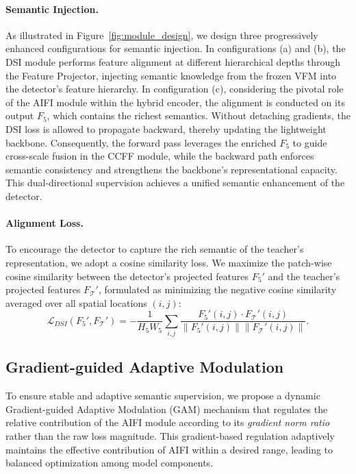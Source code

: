 \paragraph{Semantic Injection.}
As illustrated in Figure~\ref{fig:module_design}, we design three progressively enhanced configurations for semantic injection.
In configurations (a) and (b), the DSI module performs feature alignment at different hierarchical depths through the Feature Projector, injecting semantic knowledge from the frozen VFM into the detector's feature hierarchy.
In configuration (c), considering the pivotal role of the AIFI module within the hybrid encoder, the alignment is conducted on its output $F_5$, which contains the richest semantics.
Without detaching gradients, the DSI loss is allowed to propagate backward, thereby updating the lightweight backbone.
Consequently, the forward pass leverages the enriched $F_5$ to guide cross-scale fusion in the CCFF module, while the backward path enforces semantic consistency and strengthens the backbone’s representational capacity.
This dual-directional supervision achieves a unified semantic enhancement of the detector.

\paragraph{Alignment Loss.} 
To encourage the detector to capture the rich semantic of the teacher's representation, we adopt a cosine similarity loss.
We maximize the patch-wise cosine similarity between the detector's projected features $F_5'$ and the teacher's projected features $F_{\mathcal{T}}'$, formulated as minimizing the negative cosine similarity averaged over all spatial locations $(i, j)$:
\begin{equation}
  \mathcal{L}_{DSI}(F_5', F_{\mathcal{T}}') = - \frac{1}{H_5 W_5} \sum_{i,j} \frac{F_5'(i,j) \cdot F_{\mathcal{T}}'(i,j)}{\|F_5'(i,j)\| \|F_{\mathcal{T}}'(i,j)\|}.
  \label{eq:cos_sim}
\end{equation}

\subsection{Gradient-guided Adaptive Modulation}
\label{subsec:gam}
To ensure stable and adaptive semantic supervision, we propose a dynamic Gradient-guided Adaptive Modulation (GAM) mechanism that regulates the relative contribution of the AIFI module according to its \textit{gradient norm ratio} rather than the raw loss magnitude. This gradient-based regulation adaptively maintains the effective contribution of AIFI within a desired range, leading to balanced optimization among model components.

